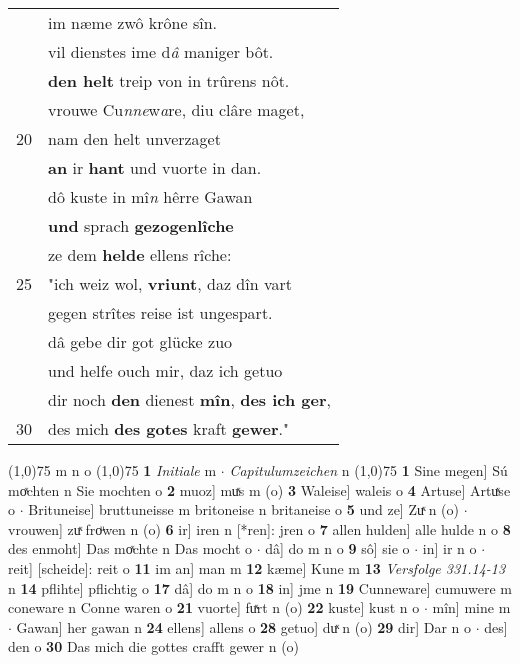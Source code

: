\documentclass[8pt,a4paper,notitlepage]{article}
\begin{document}
\begin{table}[ht]
\begin{minipage}[t]{0.5\linewidth}
\begin{tabular}{rl}
 & im næme zwô krône sîn.\\ 
 & vil dienstes ime d\textit{â} maniger bôt.\\ 
 & \textbf{den helt} treip von in trûrens nôt.\\ 
 & vrouwe Cu\textit{nne}w\textit{a}re, diu clâre maget,\\ 
20 & nam den helt unverzaget\\ 
 & \textbf{an} ir \textbf{hant} und vuorte in dan.\\ 
 & dô kuste in mî\textit{n} hêrre Gawan\\ 
 & \textbf{und} sprach \textbf{gezogenlîche}\\ 
 & ze dem \textbf{helde} ellens rîche:\\ 
25 & "ich weiz wol, \textbf{vriunt}, daz dîn vart\\ 
 & gegen strîtes reise ist ungespart.\\ 
 & dâ gebe dir got glücke zuo\\ 
 & und helfe ouch mir, daz ich getuo\\ 
 & dir noch \textbf{den} dienest \textbf{mîn}, \textbf{des ich ger},\\ 
30 & des mich \textbf{des gotes} kraft \textbf{gewer}."\\ 
\end{tabular}
\scriptsize
\line(1,0){75} \newline
m n o \newline
\line(1,0){75} \newline
\textbf{1} \textit{Initiale} m   $\cdot$ \textit{Capitulumzeichen} n  \newline
\line(1,0){75} \newline
\textbf{1} Sine megen] Sú moͯchten n Sie mochten o \textbf{2} muoz] muͯs m (o) \textbf{3} Waleise] waleis o \textbf{4} Artuse] Artuͯse o  $\cdot$ Brituneise] bruttuneisse m britoneise n britaneise o \textbf{5} und ze] Zuͯ n (o)  $\cdot$ vrouwen] zuͯ froͧwen n (o) \textbf{6} ir] iren n [*ren]: jren o \textbf{7} allen hulden] alle hulde n o \textbf{8} des enmoht] Das moͯchte n Das mocht o  $\cdot$ dâ] do m n o \textbf{9} sô] sie o  $\cdot$ in] ir n o  $\cdot$ reit] [scheide]: reit o \textbf{11} im an] man m \textbf{12} kæme] Kune m \textbf{13} \textit{Versfolge 331.14-13} n  \textbf{14} pflihte] pflichtig o \textbf{17} dâ] do m n o \textbf{18} in] jme n \textbf{19} Cunneware] cumuwere m coneware n Conne waren o \textbf{21} vuorte] fuͯrt n (o) \textbf{22} kuste] kust n o  $\cdot$ mîn] mine m  $\cdot$ Gawan] her gawan n \textbf{24} ellens] allens o \textbf{28} getuo] duͯ n (o) \textbf{29} dir] Dar n o  $\cdot$ des] den o \textbf{30} Das mich die gottes crafft gewer n (o) \newline
\end{minipage}
\end{table}
\end{document}

